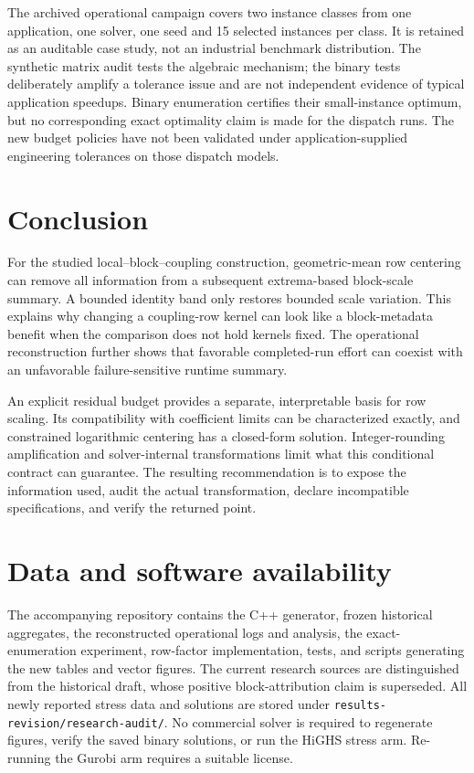 \documentclass[11pt]{article}
\theoremstyle{definition}
\theoremstyle{remark}
\begin{document}
The archived operational campaign covers two instance classes from one application,
one solver, one seed and 15 selected instances per class. It is retained as an auditable
case study, not an industrial benchmark distribution. The synthetic matrix audit tests
the algebraic mechanism; the binary tests deliberately amplify a tolerance issue and
are not independent evidence of typical application speedups. Binary enumeration
certifies their small-instance optimum, but no corresponding exact optimality claim is
made for the dispatch runs. The new budget policies have not been validated under
application-supplied engineering tolerances on those dispatch models.

\section{Conclusion}
For the studied local--block--coupling construction, geometric-mean row centering
can remove all information from a subsequent extrema-based block-scale summary.
A bounded identity band only restores bounded scale variation. This explains why
changing a coupling-row kernel can look like a block-metadata benefit when the
comparison does not hold kernels fixed. The operational reconstruction further shows
that favorable completed-run effort can coexist with an unfavorable failure-sensitive
runtime summary.

An explicit residual budget provides a separate, interpretable basis for row scaling.
Its compatibility with coefficient limits can be characterized exactly, and constrained
logarithmic centering has a closed-form solution. Integer-rounding amplification and
solver-internal transformations limit what this conditional contract can guarantee.
The resulting recommendation is to expose the information used, audit the actual
transformation, declare incompatible specifications, and verify the returned point.

\section*{Data and software availability}
The accompanying repository contains the C++ generator, frozen historical aggregates,
the reconstructed operational logs and analysis, the exact-enumeration experiment,
row-factor implementation, tests, and scripts generating the new tables and vector
figures. The current research sources are distinguished from the historical draft,
whose positive block-attribution claim is superseded. All newly reported stress data
and solutions are stored under \texttt{results-revision/research-audit/}. No commercial
solver is required to regenerate figures, verify the saved binary solutions, or run the
HiGHS stress arm. Re-running the Gurobi arm requires a suitable license.
\end{document}
